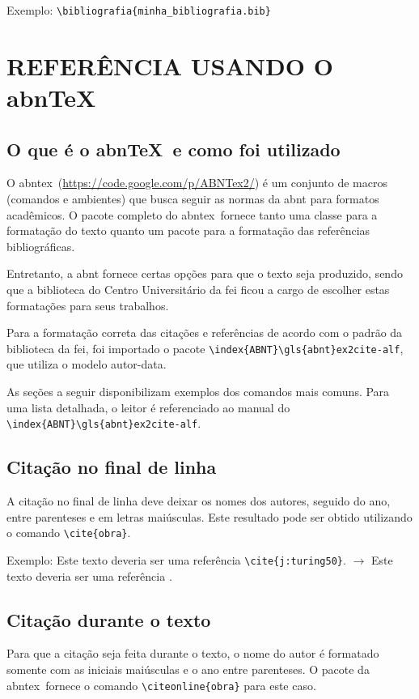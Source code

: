 \documentclass{fei}
\begin{document}
    Exemplo: \verb+\bibliografia{minha_bibliografia.bib}+

\chapter{REFERÊNCIA USANDO O abn\TeX}\label{chap:referencia}

    \section{O que é o abn\TeX~e como foi utilizado}

    O \gls{abntex}~(\url{https://code.google.com/p/ABNTex2/}) é um conjunto de macros (comandos e ambientes) que busca seguir as normas da \gls{abnt} para formatos acadêmicos. O pacote completo do \gls{abntex}~fornece tanto uma classe para a formatação do texto quanto um pacote para a formatação das referências bibliográficas.

    Entretanto, a \gls{abnt} fornece certas opções para que o texto seja produzido, sendo que a biblioteca do Centro Universitário da \gls{fei} ficou a cargo de escolher estas formatações para seus trabalhos.

    Para a formatação correta das citações e referências de acordo com o padrão da biblioteca da \gls{fei}, foi importado o pacote \verb+\index{ABNT}\gls{abnt}ex2cite-alf+, que utiliza o modelo autor-data.

    As seções a seguir disponibilizam exemplos dos comandos mais comuns. Para uma lista detalhada, o leitor é referenciado ao manual do \verb+\index{ABNT}\gls{abnt}ex2cite-alf+.

    \section{Citação no final de linha}
    A citação no final de linha deve deixar os nomes dos autores, seguido do ano, entre parenteses e em letras maiúsculas. Este resultado pode ser obtido utilizando o comando \verb+\cite{obra}+.

    Exemplo: Este texto deveria ser uma referência \verb+\cite{j:turing50}+. $\to$ Este texto deveria ser uma referência \cite{j:turing50}.

    \section{Citação durante o texto}
    Para que a citação seja feita durante o texto, o nome do autor é formatado somente com as iniciais maiúsculas e o ano entre parenteses. O pacote da \gls{abntex}~fornece o comando \verb+\citeonline{obra}+ para este caso.
\end{document}
